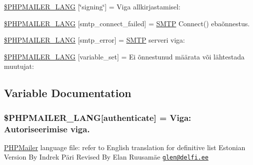 \begin{DoxyCompactItemize}
\item 
\hyperlink{phpmailer_8lang-et_8php_a30009d02935bb1683b9610dab63b8f6b}{\$\+P\+H\+P\+M\+A\+I\+L\+E\+R\+\_\+\+L\+A\+NG} \mbox{[}\char`\"{}signing\char`\"{}\mbox{]} = \textquotesingle{}Viga allkirjastamisel\+: \textquotesingle{}
\item 
\hyperlink{phpmailer_8lang-et_8php_a7b321d4ca1e9df702403ed4c61aa0980}{\$\+P\+H\+P\+M\+A\+I\+L\+E\+R\+\_\+\+L\+A\+NG} \mbox{[}\textquotesingle{}smtp\+\_\+connect\+\_\+failed\textquotesingle{}\mbox{]} = \textquotesingle{}\hyperlink{class_s_m_t_p}{S\+M\+TP} Connect() ebaõnnestus.\textquotesingle{}
\item 
\hyperlink{phpmailer_8lang-et_8php_a7d9cffba1e669c845f8a4c891ee50064}{\$\+P\+H\+P\+M\+A\+I\+L\+E\+R\+\_\+\+L\+A\+NG} \mbox{[}\textquotesingle{}smtp\+\_\+error\textquotesingle{}\mbox{]} = \textquotesingle{}\hyperlink{class_s_m_t_p}{S\+M\+TP} serveri viga\+: \textquotesingle{}
\item 
\hyperlink{phpmailer_8lang-et_8php_af795debc7a739d038742691c358d9032}{\$\+P\+H\+P\+M\+A\+I\+L\+E\+R\+\_\+\+L\+A\+NG} \mbox{[}\textquotesingle{}variable\+\_\+set\textquotesingle{}\mbox{]} = \textquotesingle{}Ei õnnestunud määrata või lähtestada muutujat\+: \textquotesingle{}
\end{DoxyCompactItemize}


\subsection{Variable Documentation}
\subsubsection[{\texorpdfstring{\$\+P\+H\+P\+M\+A\+I\+L\+E\+R\+\_\+\+L\+A\+NG}{$PHPMAILER_LANG}}]{\setlength{\rightskip}{0pt plus 5cm}\$P\+H\+P\+M\+A\+I\+L\+E\+R\+\_\+\+L\+A\+NG\mbox{[}\textquotesingle{}authenticate\textquotesingle{}\mbox{]} =  Viga\+: Autoriseerimise viga.\textquotesingle{}}\hypertarget{phpmailer_8lang-et_8php_a2cb33073c989b85580748e331ed8b4aa}{}\label{phpmailer_8lang-et_8php_a2cb33073c989b85580748e331ed8b4aa}
\hyperlink{class_p_h_p_mailer}{P\+H\+P\+Mailer} language file\+: refer to English translation for definitive list Estonian Version By Indrek Päri Revised By Elan Ruusamäe \href{mailto:glen@delfi.ee}{\tt glen@delfi.\+ee} 

